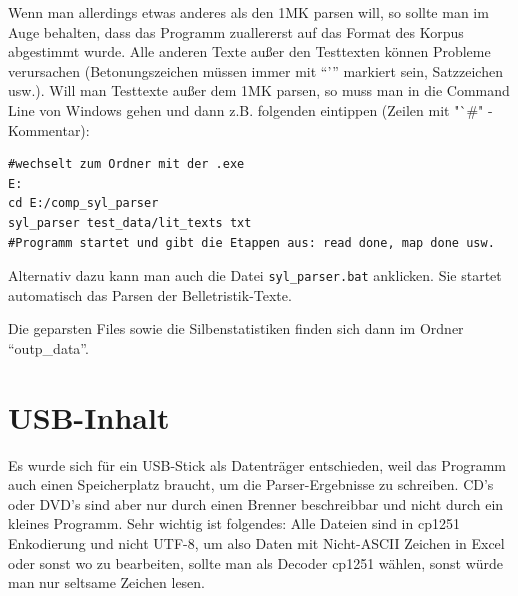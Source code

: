 \documentclass[12pt,headsepline,a4paper]{scrartcl}
\begin{document}
Wenn man allerdings etwas anderes als den 1MK parsen will, so sollte man im Auge behalten, dass das Programm zuallererst auf das Format des Korpus abgestimmt wurde. Alle anderen Texte außer den Testtexten können Probleme verursachen (Betonungszeichen müssen immer mit "`'"' markiert sein, Satzzeichen usw.).
Will man Testtexte außer dem 1MK parsen, so muss man in die Command Line von Windows gehen und dann z.B. folgenden eintippen (Zeilen mit "`\#" -Kommentar):
\begin{verbatim}
#wechselt zum Ordner mit der .exe
E:
cd E:/comp_syl_parser
syl_parser test_data/lit_texts txt
#Programm startet und gibt die Etappen aus: read done, map done usw.
\end{verbatim}
Alternativ dazu kann man auch die Datei \texttt{syl\_parser.bat} anklicken. Sie startet automatisch das Parsen der Belletristik-Texte.

Die geparsten Files sowie die Silbenstatistiken finden sich dann im Ordner "`outp\_data"'.
\newpage

\section{USB-Inhalt}
Es wurde sich für ein USB-Stick als Datenträger entschieden, weil das Programm auch einen Speicherplatz braucht, um die Parser-Ergebnisse zu schreiben. CD's oder DVD's sind aber nur durch einen Brenner beschreibbar und nicht durch ein kleines Programm. Sehr wichtig ist folgendes: Alle Dateien sind in cp1251 Enkodierung und nicht UTF-8, um also Daten mit Nicht-ASCII Zeichen in Excel oder sonst wo zu bearbeiten, sollte man als Decoder cp1251 wählen, sonst würde man nur seltsame Zeichen lesen.
\end{document}
